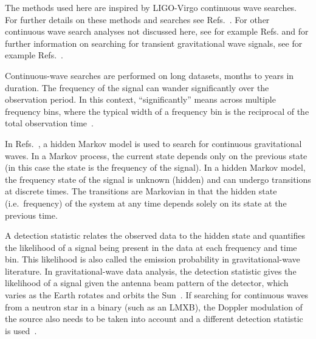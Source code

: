 \documentclass[paper-main.tex]{subfiles}
\begin{document}

The methods used here are inspired by LIGO-Virgo continuous wave searches. 
For further details on these methods and searches see Refs.~\cite{SuvorovaEtAl:2016, SuvorovaEtAl:2017, ScoX1O2Viterbi:2019, ScoX1ViterbiO1:2017, BeniwalEtAl:2021, MillhouseStrangMelatos:2020, JonesSun:2020, MiddletonEtAlO2LMXBs:2020, PostMergerRemnantSearch:2019, BayleyEtAlSOAP:2019, SunEtAlSNR:2018}.
For other continuous wave search analyses not discussed here, see for example Refs.\cite{UnknownNSSearchO3a:2021, EinsteinAtHomeO2:2021, MSPSearchO3O2O1:2020, RadiometerO1O2:2019, SearchCrossCorrO1:2017, SearchTwoSpecS6:2017, VirgoCrabVelaSearch:2015, StackSlide:2012} and for further information on searching for transient gravitational wave signals, see for example Refs.~\cite{MillhouseEtAl:2018, Mohanty:2017, AddessoEtAl:2016, ThraneCoughlin:2014, ThraneEtAl:2011, CandesEtAl:2008, ChassandeMottinArchana:2006, AndersonBalasubramanian:1999}.


Continuous-wave searches are performed on long datasets, months to years in duration. 
The frequency of the signal can wander significantly over the observation period. 
In this context, ``significantly'' means across multiple frequency bins, where the typical width of a frequency bin is the reciprocal of the total observation time~\cite{JKS:1998,ScoX1O2Viterbi:2019}.


In Refs.~\cite{SuvorovaEtAl:2016,SuvorovaEtAl:2017}, a hidden Markov model is used to search for continuous gravitational waves. 
In a Markov process, the current state depends only on the previous state (in this case the state is the frequency of the signal). 
In a hidden Markov model, the frequency state of the signal is unknown (hidden) and can undergo transitions at discrete times. 
The transitions are Markovian in that the hidden state (i.e.\ frequency) of the system at any time depends solely on its state at the previous time. 


A detection statistic relates the observed data to the hidden state and quantifies the likelihood of a signal being present in the data at each frequency and time bin.
This likelihood is also called the emission probability in gravitational-wave literature.  
In gravitational-wave data analysis, the detection statistic gives the likelihood of a signal given the antenna beam pattern of the detector, which varies as the Earth rotates and orbits the Sun~\cite{JKS:1998}.
If searching for continuous waves from a neutron star in a binary (such as an LMXB), the Doppler modulation of the source also needs to be taken into account and a different detection statistic is used~\cite{SuvorovaEtAl:2017}. 
\end{document}
